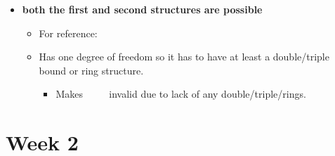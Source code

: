 \documentclass[12pt,a4paper]{article}
\begin{document}
\begin{enumerate}
        \begin{itemize}
            \item {\color{o-Sun}\textbf{both the first and second structures are possible}}
                \begin{itemize}
                    \item For reference: 
                    \hspace{8pt}
                    {\tiny{}
                    \hspace{12pt}
                    }
                    \item Has one degree of freedom so it has to have at least a double/triple bound or ring structure.
                        \begin{itemize}
                            \item Makes ~~{\tiny{}} ~~invalid due to lack of any double/triple/rings.
                        \end{itemize}
                \end{itemize}
        \end{itemize}
\end{enumerate}

\clearpage
\section*{Week 2}
{}
\end{document}
